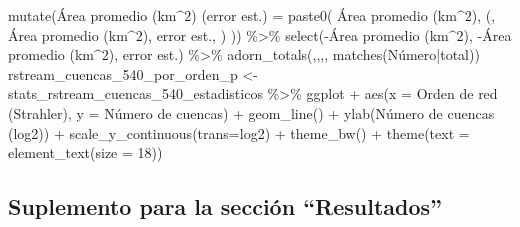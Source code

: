 \documentclass[spanish]{article}
\newenvironment{Shaded}{\begin{snugshade}}{\end{snugshade}}
\newcommand{\AttributeTok}[1]{\textcolor[rgb]{0.77,0.63,0.00}{#1}}
\newcommand{\DecValTok}[1]{\textcolor[rgb]{0.00,0.00,0.81}{#1}}
\newcommand{\FunctionTok}[1]{\textcolor[rgb]{0.00,0.00,0.00}{#1}}
\newcommand{\NormalTok}[1]{#1}
\newcommand{\OtherTok}[1]{\textcolor[rgb]{0.56,0.35,0.01}{#1}}
\newcommand{\SpecialCharTok}[1]{\textcolor[rgb]{0.00,0.00,0.00}{#1}}
\newcommand{\StringTok}[1]{\textcolor[rgb]{0.31,0.60,0.02}{#1}}
\begin{document}
\begin{Shaded}
\begin{Highlighting}[]
  \FunctionTok{mutate}\NormalTok{(}\StringTok{\textasciigrave{}}\AttributeTok{Área promedio (km$\^{}2$) (error est.)}\StringTok{\textasciigrave{}} \OtherTok{=} \FunctionTok{paste0}\NormalTok{(}
    \StringTok{\textasciigrave{}}\AttributeTok{Área promedio (km$\^{}2$)}\StringTok{\textasciigrave{}}\NormalTok{, }\StringTok{\textquotesingle{} (\textquotesingle{}}\NormalTok{,}
    \StringTok{\textasciigrave{}}\AttributeTok{Área promedio (km$\^{}2$), error est.}\StringTok{\textasciigrave{}}\NormalTok{, }\StringTok{\textquotesingle{})\textquotesingle{}}
\NormalTok{  )) }\SpecialCharTok{\%\textgreater{}\%} 
  \FunctionTok{select}\NormalTok{(}\SpecialCharTok{{-}}\StringTok{\textasciigrave{}}\AttributeTok{Área promedio (km$\^{}2$)}\StringTok{\textasciigrave{}}\NormalTok{, }\SpecialCharTok{{-}}\StringTok{\textasciigrave{}}\AttributeTok{Área promedio (km$\^{}2$), error est.}\StringTok{\textasciigrave{}}\NormalTok{) }\SpecialCharTok{\%\textgreater{}\%} 
  \FunctionTok{adorn\_totals}\NormalTok{(,,,, }\FunctionTok{matches}\NormalTok{(}\StringTok{\textquotesingle{}Número|total\textquotesingle{}}\NormalTok{))}
\NormalTok{rstream\_cuencas\_540\_por\_orden\_p }\OtherTok{\textless{}{-}}\NormalTok{ stats\_rstream\_cuencas\_540\_estadisticos }\SpecialCharTok{\%\textgreater{}\%} 
\NormalTok{  ggplot }\SpecialCharTok{+} \FunctionTok{aes}\NormalTok{(}\AttributeTok{x =} \StringTok{\textasciigrave{}}\AttributeTok{Orden de red (Strahler)}\StringTok{\textasciigrave{}}\NormalTok{, }\AttributeTok{y =} \StringTok{\textasciigrave{}}\AttributeTok{Número de cuencas}\StringTok{\textasciigrave{}}\NormalTok{) }\SpecialCharTok{+}
  \FunctionTok{geom\_line}\NormalTok{() }\SpecialCharTok{+} \FunctionTok{ylab}\NormalTok{(}\StringTok{\textquotesingle{}Número de cuencas (log2)\textquotesingle{}}\NormalTok{) }\SpecialCharTok{+}
  \FunctionTok{scale\_y\_continuous}\NormalTok{(}\AttributeTok{trans=}\StringTok{\textquotesingle{}log2\textquotesingle{}}\NormalTok{) }\SpecialCharTok{+}
  \FunctionTok{theme\_bw}\NormalTok{() }\SpecialCharTok{+}
  \FunctionTok{theme}\NormalTok{(}\AttributeTok{text =} \FunctionTok{element\_text}\NormalTok{(}\AttributeTok{size =} \DecValTok{18}\NormalTok{))}
\end{Highlighting}
\end{Shaded}

\hypertarget{suplemento-para-la-secciuxf3n-resultados}{%
\subsection{Suplemento para la sección
``Resultados''}\label{suplemento-para-la-secciuxf3n-resultados}}
\end{document}
